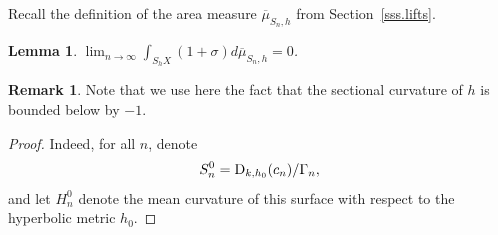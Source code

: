 \documentclass[10pt]{amsart}
\theoremstyle{plain}
\newtheorem{lemma}[theorem]{Lemma}
\theoremstyle{definition}
\newtheorem{remark}[theorem]{Remark}
\begin{document}
Recall the definition of the area measure $\overline{\mu}_{S_n,h}$ from Section~\ref{sss.lifts}.

\begin{lemma}\label{l.sect_approaches-1}
$\displaystyle\lim_{n\to\infty} \int_{S_hX}(1+\sigma)d\overline{\mu}_{S_n,h}=0$.
\end{lemma}

\begin{remark}
Note that we use here the fact that the sectional curvature of $h$ is bounded below by $-1$.
\end{remark}

\begin{proof}
Indeed, for all $n$, denote\vspace*{-3pt}
\begin{equation*}
S_n^0=\text D_{k,h_0}(c_n)/\Gamma_n,
\end{equation*}
and let $H_n^0$ denote the mean curvature of this surface with respect to the hyperbolic metric $h_0$.


\end{proof}
\end{document}
